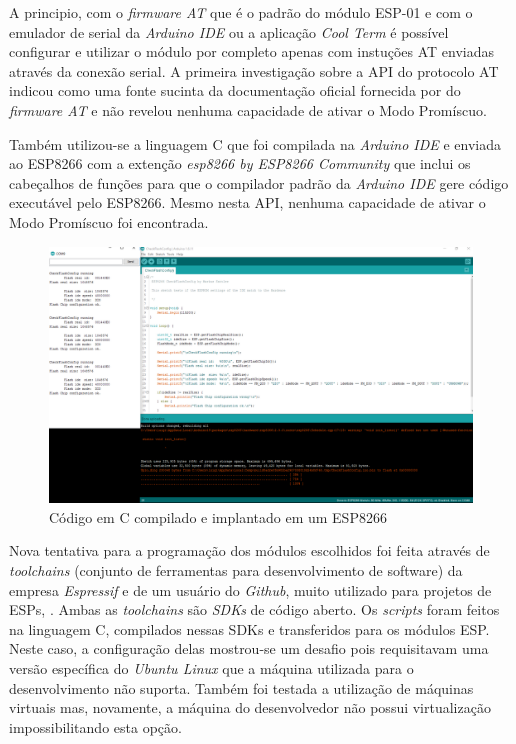 A principio, com o \emph{firmware AT} que é o padrão do módulo ESP-01 e com o
emulador de serial da \emph{Arduino IDE} ou a aplicação \emph{Cool Term} é
possível configurar e utilizar o módulo por completo apenas com instuções AT
enviadas através da conexão serial. A primeira investigação sobre a API do protocolo
AT indicou  como uma fonte sucinta da documentação
oficial fornecida por  do \emph{firmware AT} e
não revelou nenhuma capacidade de ativar o Modo Promíscuo.

Também utilizou-se a linguagem C que foi compilada na \emph{Arduino IDE} e
enviada ao ESP8266 com a extenção \emph{esp8266 by ESP8266 Community} que inclui
os cabeçalhos de funções para que o compilador padrão da \emph{Arduino IDE} gere
código  executável pelo ESP8266. Mesmo nesta API, nenhuma capacidade de ativar o
Modo Promíscuo foi encontrada.

\begin{figure}[htb]
	\caption{\label{fig-esp-arduino}Código em C compilado e implantado em um ESP8266}
	\begin{center}
		\includegraphics[width=1\textwidth]{040-plataformas/esp-dev/arduino-ide.png}
	\end{center}
\end{figure}


Nova tentativa para a programação  dos módulos escolhidos foi feita através de
\emph{toolchains} (conjunto de ferramentas para desenvolvimento de software) da
empresa \emph{Espressif} e de um usuário do \emph{Github}, muito utilizado para
projetos de ESPs, . Ambas as \emph{toolchains}
são \emph{SDKs} de código aberto. Os \emph{scripts} foram feitos na linguagem C,
compilados nessas SDKs e transferidos para os módulos ESP. Neste caso,
a configuração delas mostrou-se um desafio pois requisitavam uma versão
específica do \emph{Ubuntu Linux} que a máquina utilizada para o desenvolvimento
não suporta. Também foi testada a utilização de máquinas virtuais mas, novamente,
a máquina do desenvolvedor não possui virtualização impossibilitando esta opção.

